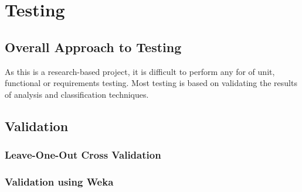 \chapter{Testing}



\section{Overall Approach to Testing}
As this is a research-based project, it is difficult to perform any for of unit, functional or 
requirements testing. Most testing is based on validating the results of analysis and 
classification techniques.


\section{Validation}



\subsection{Leave-One-Out Cross Validation}


\subsection{Validation using Weka}


